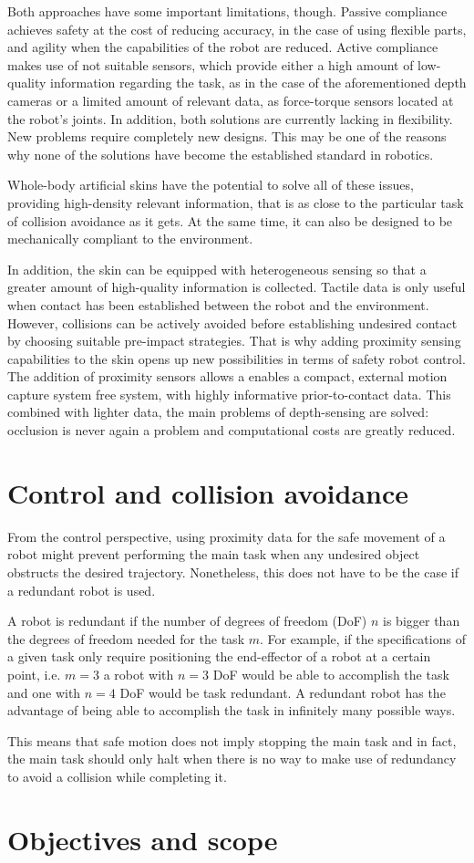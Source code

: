 Both approaches have some important limitations, though. Passive compliance achieves safety at the cost of reducing accuracy, in the case of using flexible parts, and agility when the capabilities of the robot are reduced. Active compliance makes use of not suitable sensors, which provide either a high amount of low-quality information regarding the task, as in the case of the aforementioned depth cameras or a limited amount of relevant data, as force-torque sensors located at the robot’s joints. In addition, both solutions are currently lacking in flexibility. New problems require completely new designs. This may be one of the reasons why none of the solutions have become the established standard in robotics.

Whole-body artificial skins have the potential to solve all of these issues, providing high-density relevant information, that is as close to the particular task of collision avoidance as it gets. At the same time, it can also be designed to be mechanically compliant to the environment.

In addition, the skin can be equipped with heterogeneous sensing so that a greater amount of high-quality information is collected. Tactile data is only useful when contact has been established between the robot and the environment. However, collisions can be actively avoided before establishing undesired contact by choosing suitable pre-impact strategies. That is why adding proximity sensing capabilities to the skin opens up new possibilities in terms of safety robot control. The addition of proximity sensors allows a enables a compact, external motion capture system free system, with highly informative prior-to-contact data. This combined with lighter data, the main problems of depth-sensing are solved: occlusion is never again a problem and computational costs are greatly reduced.
\section{Control and collision avoidance}
From the control perspective, using proximity data for the safe movement of a robot might prevent performing the main task when any undesired object obstructs the desired trajectory. Nonetheless, this does not have to be the case if a redundant robot is used.

A robot is redundant if the number of degrees of freedom (DoF) $n$ is bigger than the degrees of freedom needed for the task $m$. For example, if the specifications of a given task only require positioning the end-effector of a robot at a certain point, i.e. $m = 3$ a robot with $n = 3$ DoF would be able to accomplish the task and one with $n = 4$ DoF would be task redundant. A redundant robot has the advantage of being able to accomplish the task in infinitely many possible ways.

This means that safe motion does not imply stopping the main task and in fact, the main task should only halt when there is no way to make use of redundancy to avoid a collision while completing it.

\section{Objectives and scope}
